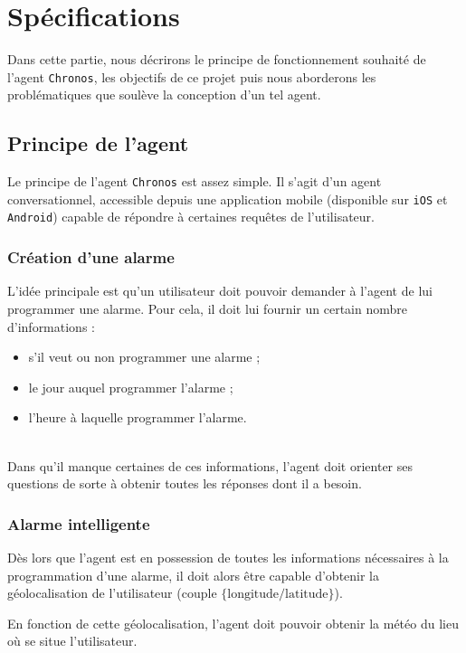 \chapter{Spécifications}

Dans cette partie, nous décrirons le principe de fonctionnement souhaité de l'agent \texttt{Chronos}, les objectifs de ce projet puis nous aborderons les problématiques que soulève la conception d'un tel agent.

\section{Principe de l'agent}
Le principe de l'agent \texttt{Chronos} est assez simple. Il s'agit d'un agent conversationnel, accessible depuis une application mobile (disponible sur \texttt{iOS} et \texttt{Android}) capable de répondre à certaines requêtes de l'utilisateur. 

\subsection{Création d'une alarme}
L'idée principale est qu'un utilisateur doit pouvoir demander à l'agent de lui programmer une alarme. Pour cela, il doit lui fournir un certain nombre d'informations :
\begin{itemize}
    \item s'il veut ou non programmer une alarme ;
    \item le jour auquel programmer l'alarme ;
    \item l'heure à laquelle programmer l'alarme.
\end{itemize}

~\\\indent
Dans qu'il manque certaines de ces informations, l'agent doit orienter ses questions de sorte à obtenir toutes les réponses dont il a besoin.

\subsection{Alarme intelligente}
Dès lors que l'agent est en possession de toutes les informations nécessaires à la programmation d'une alarme, il doit alors être capable d'obtenir la géolocalisation de l'utilisateur (couple $\{\text{longitude} / \text{latitude} \}$). 

En fonction de cette géolocalisation, l'agent doit pouvoir obtenir la météo du lieu où se situe l'utilisateur. %


